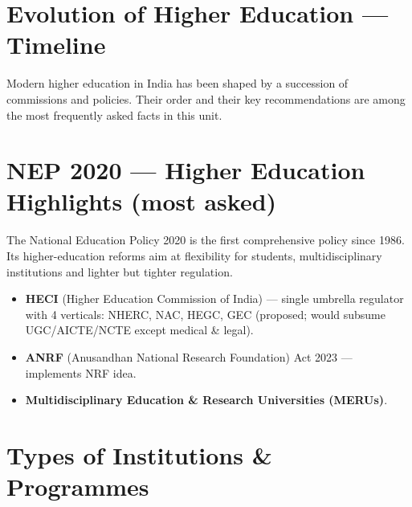 \needspace{125pt}

\hypertarget{p1-10--2-evolution-of-higher-education--timeline}{%
\section{Evolution of Higher Education --- Timeline}\label{p1-10--2-evolution-of-higher-education--timeline}}

Modern higher education in India has been shaped by a succession of commissions and policies. Their order
and their key recommendations are among the most frequently asked facts in this unit.



\needspace{125pt}

\hypertarget{p1-10--3-nep-2020--higher-education-highlights-most-asked}{%
\section{NEP 2020 --- Higher Education Highlights (most asked)}\label{p1-10--3-nep-2020--higher-education-highlights-most-asked}}

The National Education Policy 2020 is the first comprehensive policy since 1986. Its higher-education
reforms aim at flexibility for students, multidisciplinary institutions and lighter but tighter regulation.



\begin{itemize}
\tightlist
\item
  \textbf{HECI} (Higher Education Commission of India) --- single umbrella regulator with 4 verticals: NHERC, NAC, HEGC, GEC (proposed; would subsume UGC/AICTE/NCTE except medical \& legal).
\item
  \textbf{ANRF} (Anusandhan National Research Foundation) Act 2023 --- implements NRF idea.
\item
  \textbf{Multidisciplinary Education \& Research Universities (MERUs)}.
\end{itemize}

\needspace{130pt}

\hypertarget{p1-10--4-types-of-institutions--programmes}{%
\section{Types of Institutions \& Programmes}\label{p1-10--4-types-of-institutions--programmes}}

\begingroup\small

